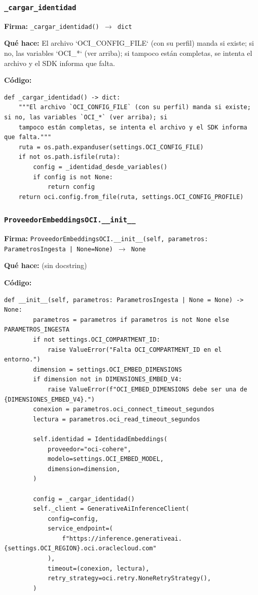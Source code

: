 \documentclass[11pt,a4paper]{article}
\begin{document}
\subsubsection*{\texttt{\_cargar\_identidad}}
\textbf{Firma:} \texttt{\_cargar\_identidad() $\rightarrow$ dict}

\textbf{Qué hace:} El archivo `OCI\_CONFIG\_FILE` (con su perfil) manda si existe; si no, las variables `OCI\_*` (ver arriba); si
tampoco están completas, se intenta el archivo y el SDK informa que falta.

\textbf{Código:}
\begin{lstlisting}
def _cargar_identidad() -> dict:
    """El archivo `OCI_CONFIG_FILE` (con su perfil) manda si existe; si no, las variables `OCI_*` (ver arriba); si
    tampoco están completas, se intenta el archivo y el SDK informa que falta."""
    ruta = os.path.expanduser(settings.OCI_CONFIG_FILE)
    if not os.path.isfile(ruta):
        config = _identidad_desde_variables()
        if config is not None:
            return config
    return oci.config.from_file(ruta, settings.OCI_CONFIG_PROFILE)
\end{lstlisting}

\subsubsection*{\texttt{ProveedorEmbeddingsOCI.\_\_init\_\_}}
\textbf{Firma:} \texttt{ProveedorEmbeddingsOCI.\_\_init\_\_(self, parametros: ParametrosIngesta | None=None) $\rightarrow$ None}

\textbf{Qué hace:} (sin docstring)

\textbf{Código:}
\begin{lstlisting}
def __init__(self, parametros: ParametrosIngesta | None = None) -> None:
        parametros = parametros if parametros is not None else PARAMETROS_INGESTA
        if not settings.OCI_COMPARTMENT_ID:
            raise ValueError("Falta OCI_COMPARTMENT_ID en el entorno.")
        dimension = settings.OCI_EMBED_DIMENSIONS
        if dimension not in DIMENSIONES_EMBED_V4:
            raise ValueError(f"OCI_EMBED_DIMENSIONS debe ser una de {DIMENSIONES_EMBED_V4}.")
        conexion = parametros.oci_connect_timeout_segundos
        lectura = parametros.oci_read_timeout_segundos

        self.identidad = IdentidadEmbeddings(
            proveedor="oci-cohere",
            modelo=settings.OCI_EMBED_MODEL,
            dimension=dimension,
        )

        config = _cargar_identidad()
        self._client = GenerativeAiInferenceClient(
            config=config,
            service_endpoint=(
                f"https://inference.generativeai.{settings.OCI_REGION}.oci.oraclecloud.com"
            ),
            timeout=(conexion, lectura),
            retry_strategy=oci.retry.NoneRetryStrategy(),
        )
\end{lstlisting}
\end{document}
